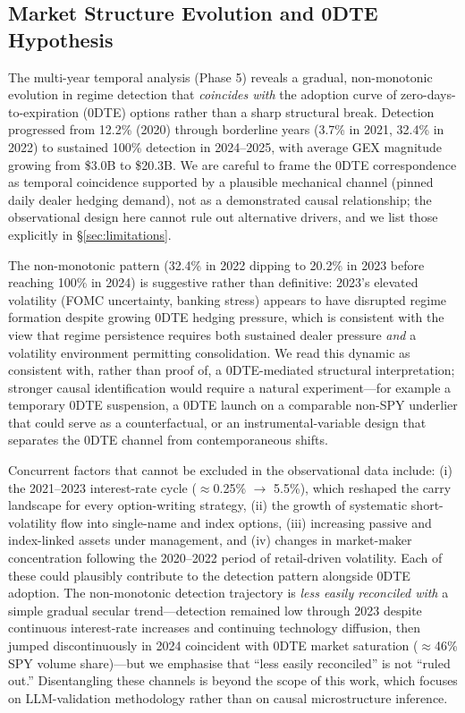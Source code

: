 \subsection{Market Structure Evolution and 0DTE Hypothesis}
\label{sec:discussion:0dte}

The multi-year temporal analysis (Phase 5) reveals a gradual, non-monotonic evolution in regime detection that \textit{coincides with} the adoption curve of zero-days-to-expiration (0DTE) options rather than a sharp structural break. Detection progressed from 12.2\% (2020) through borderline years (3.7\% in 2021, 32.4\% in 2022) to sustained 100\% detection in 2024--2025, with average GEX magnitude growing from \$3.0B to \$20.3B. We are careful to frame the 0DTE correspondence as temporal coincidence supported by a plausible mechanical channel (pinned daily dealer hedging demand), not as a demonstrated causal relationship; the observational design here cannot rule out alternative drivers, and we list those explicitly in \S\ref{sec:limitations}.

The non-monotonic pattern (32.4\% in 2022 dipping to 20.2\% in 2023 before reaching 100\% in 2024) is suggestive rather than definitive: 2023's elevated volatility (FOMC uncertainty, banking stress) appears to have disrupted regime formation despite growing 0DTE hedging pressure, which is consistent with the view that regime persistence requires both sustained dealer pressure \textit{and} a volatility environment permitting consolidation. We read this dynamic as consistent with, rather than proof of, a 0DTE-mediated structural interpretation; stronger causal identification would require a natural experiment---for example a temporary 0DTE suspension, a 0DTE launch on a comparable non-SPY underlier that could serve as a counterfactual, or an instrumental-variable design that separates the 0DTE channel from contemporaneous shifts.

Concurrent factors that cannot be excluded in the observational data include: (i) the 2021--2023 interest-rate cycle ($\approx$0.25\% $\rightarrow$ 5.5\%), which reshaped the carry landscape for every option-writing strategy, (ii) the growth of systematic short-volatility flow into single-name and index options, (iii) increasing passive and index-linked assets under management, and (iv) changes in market-maker concentration following the 2020--2022 period of retail-driven volatility. Each of these could plausibly contribute to the detection pattern alongside 0DTE adoption. The non-monotonic detection trajectory is \textit{less easily reconciled with} a simple gradual secular trend---detection remained low through 2023 despite continuous interest-rate increases and continuing technology diffusion, then jumped discontinuously in 2024 coincident with 0DTE market saturation ($\approx$46\% SPY volume share)---but we emphasise that ``less easily reconciled'' is not ``ruled out.'' Disentangling these channels is beyond the scope of this work, which focuses on LLM-validation methodology rather than on causal microstructure inference.

